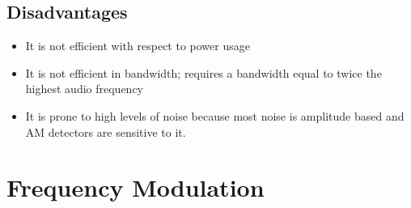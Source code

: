 \documentclass[12pt,a4paper]{article}%
\begin{document}
\begin{flushleft}
		\subsection{Disadvantages}
		\begin{itemize}
			\item{It is not efficient with respect to power usage}
			\item{It is not efficient in bandwidth; requires a bandwidth equal to twice the highest audio frequency
}
			\item{It is prone to high levels of noise because most noise is amplitude based and AM detectors are sensitive to it.}
		\end{itemize}
	\end{flushleft}
	\pagebreak
	\section{Frequency Modulation}
\end{document}

